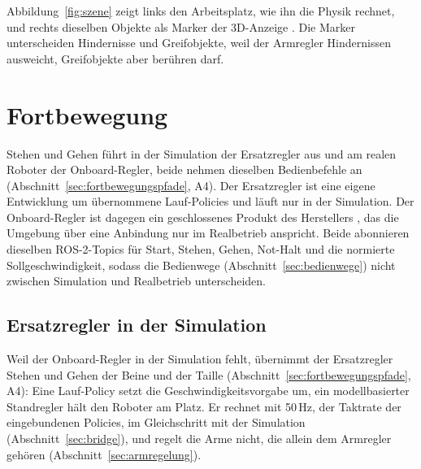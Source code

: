 Abbildung~\ref{fig:szene} zeigt links den Arbeitsplatz, wie ihn die Physik rechnet, und rechts dieselben Objekte als Marker der 3D-Anzeige .
Die Marker unterscheiden Hindernisse und Greifobjekte, weil der Armregler Hindernissen ausweicht, Greifobjekte aber berühren darf.


\section{Fortbewegung}
\label{sec:fortbewegung_umsetzung}
Stehen und Gehen führt in der Simulation der Ersatzregler aus und am realen Roboter der Onboard-Regler, beide nehmen dieselben Bedienbefehle an (Abschnitt~\ref{sec:fortbewegungspfade}, A4).
Der Ersatzregler ist eine eigene Entwicklung um übernommene Lauf-Policies und läuft nur in der Simulation.
Der Onboard-Regler ist dagegen ein geschlossenes Produkt des Herstellers \cite{Hu2026}, das die Umgebung über eine Anbindung nur im Realbetrieb anspricht.
Beide abonnieren dieselben ROS-2-Topics für Start, Stehen, Gehen, Not-Halt und die normierte Sollgeschwindigkeit, sodass die Bedienwege (Abschnitt~\ref{sec:bedienwege}) nicht zwischen Simulation und Realbetrieb unterscheiden.

\subsection{Ersatzregler in der Simulation}
\label{sec:ersatzregler}
Weil der Onboard-Regler in der Simulation fehlt, übernimmt der Ersatzregler Stehen und Gehen der Beine und der Taille (Abschnitt~\ref{sec:fortbewegungspfade}, A4): Eine Lauf-Policy setzt die Geschwindigkeitsvorgabe um, ein modellbasierter Standregler hält den Roboter am Platz.
Er rechnet mit 50\,Hz, der Taktrate der eingebundenen Policies, im Gleichschritt mit der Simulation (Abschnitt~\ref{sec:bridge}), und regelt die Arme nicht, die allein dem Armregler gehören (Abschnitt~\ref{sec:armregelung}).

